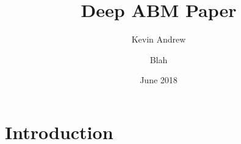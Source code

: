 \documentclass{article}
\title{Deep ABM Paper}
\author{Kevin Andrew \and Blah}
\date{June 2018}
\begin{document}
\maketitle

\section{Introduction}
\end{document}
